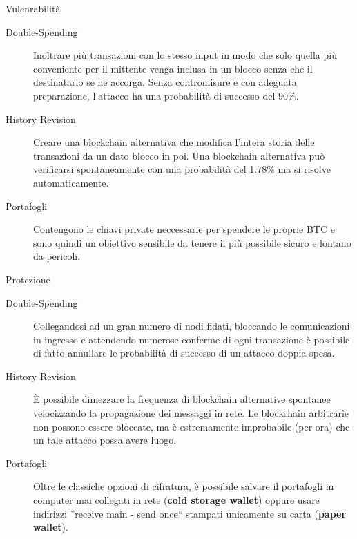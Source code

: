 \documentclass[italian]{beamer}
\begin{document}

\begin{frame}{Vulenrabilità} %
 \begin{description}
  \item[Double-Spending] Inoltrare più transazioni con lo stesso input in modo che solo quella più conveniente per il mittente venga inclusa in un blocco senza che il destinatario se ne accorga. Senza contromisure e con adeguata preparazione, l'attacco ha una probabilità di successo del 90\%.
  \item[History Revision] Creare una blockchain alternativa che modifica l'intera storia delle transazioni da un dato blocco in poi. Una blockchain alternativa può verificarsi spontaneamente con una probabilità del 1.78\% ma si risolve automaticamente.
  \item[Portafogli] Contengono le chiavi private neccessarie per spendere le proprie BTC e sono quindi un obiettivo sensibile da tenere il più possibile sicuro e lontano da pericoli.
 \end{description}
\end{frame}

\begin{frame}{Protezione} %
 \begin{description}
  \item[Double-Spending] Collegandosi ad un gran numero di nodi fidati, bloccando le comunicazioni in ingresso e attendendo numerose conferme di ogni transazione è possibile di fatto annullare le probabilità di successo di un attacco doppia-spesa.
  \item[History Revision] È possibile dimezzare la frequenza di blockchain alternative spontanee velocizzando la propagazione dei messaggi in rete. Le blockchain arbitrarie non possono essere bloccate, ma è estremamente improbabile (per ora) che un tale attacco possa avere luogo.
  \item[Portafogli] Oltre le classiche opzioni di cifratura, è possibile salvare il portafogli in computer mai collegati in rete (\textbf{cold storage wallet}) oppure usare indirizzi ''receive main - send once`` stampati unicamente su carta (\textbf{paper wallet}).
 \end{description}
\end{frame}
\end{document}

